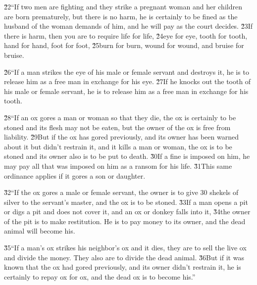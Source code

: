 \v{22}``If two men are fighting and they strike a pregnant woman and her children are born prematurely, but there is no harm, he is certainly to be fined as the husband of the woman demands of him, and he will pay as the court decides. \v{23}If there is harm, then you are to require life for life, \v{24}eye for eye, tooth for tooth, hand for hand, foot for foot, \v{25}burn for burn, wound for wound, and bruise for bruise.

\v{26}``If a man strikes the eye of his male or female servant and destroys it, he is to release him as a free man in exchange for his eye. \v{27}If he knocks out the tooth of his male or female servant, he is to release him as a free man in exchange for his tooth.

\v{28}``If an ox gores a man or woman so that they die, the ox is certainly to be stoned and its flesh may not be eaten, but the owner of the ox is free from liability. \v{29}But if the ox has gored previously, and its owner has been warned about it but didn't restrain it, and it kills a man or woman, the ox is to be stoned and its owner also is to be put to death. \v{30}If a fine is imposed on him, he may pay all that was imposed on him as a ransom for his life. \v{31}This same ordinance applies if it gores a son or daughter.

\v{32}``If the ox gores a male or female servant, the owner is to give 30 shekels of silver to the servant's master, and the ox is to be stoned. \v{33}If a man opens a pit or digs a pit and does not cover it, and an ox or donkey falls into it, \v{34}the owner of the pit is to make restitution. He is to pay money to its owner, and the dead animal will become his.

\v{35}``If a man's ox strikes his neighbor's ox and it dies, they are to sell the live ox and divide the money. They also are to divide the dead animal. \v{36}But if it was known that the ox had gored previously, and its owner didn't restrain it, he is certainly to repay ox for ox, and the dead ox is to become his.''

